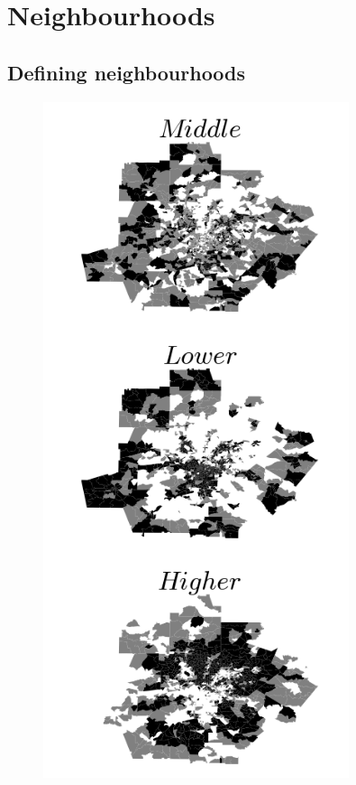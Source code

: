 \section{Neighbourhoods}
\label{sec:neighbourhoods}

\subsection{Defining neighbourhoods}
\label{sub:defining_neighbourhoods}

\begin{figure}[!h]
    \centering
    \includegraphics[width=0.8\textwidth]{./gfx/chapter-segregation/figure2.png}

\end{figure}
